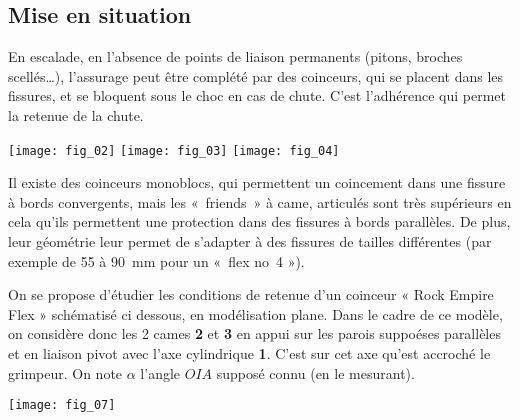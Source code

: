 
\subsection*{Mise en situation}

En escalade, en l’absence de points de liaison permanents (pitons, broches scellés…), l’assurage peut être complété par des coinceurs, qui se placent dans les fissures, et se bloquent sous le choc en cas de chute. C’est l’adhérence qui permet la retenue de la chute.
\begin{center}
\texttt{[image: fig\_02]}
\texttt{[image: fig\_03]}
\texttt{[image: fig\_04]}
\end{center}
Il existe des coinceurs monoblocs, qui permettent un coincement dans une fissure à bords convergents, mais les 
«~friends~» à came, articulés sont très supérieurs en cela qu’ils permettent une protection dans des fissures à bords parallèles. De plus, leur géométrie leur permet de s’adapter à des fissures de tailles différentes (par exemple de 55 à \SI{90}{mm} pour un «~flex no~4 »).

On se propose d’étudier les conditions de retenue d’un coinceur « Rock Empire Flex » schématisé ci dessous, en modélisation plane. Dans le cadre de ce modèle, on considère donc les 2 cames \textbf{2} et \textbf{3} en appui sur les parois suppoéses parallèles et en liaison pivot avec l'axe cylindrique \textbf{1}. C'est sur cet axe qu'est accroché le grimpeur.  
On note $\alpha$ l'angle $OIA$ supposé connu (en le mesurant). 

\begin{center}
\texttt{[image: fig\_07]}
\end{center}

\ifprof
\begin{corrige}~\\
\end{corrige}
\else
\fi


\ifprof
\begin{corrige}~\\
\end{corrige}
\else
\fi

